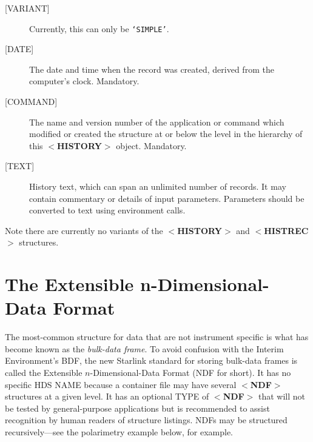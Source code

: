 \documentclass[twoside,11pt]{article}
\newcommand{\xlabel}[1]{}
\renewcommand{\_}{\texttt{\symbol{95}}}
\begin{document}
\begin{description}
\item [{[}VARIANT{]}]
Currently, this can only be {\tt `SIMPLE'}.
\item [{[}DATE{]}]
The date and time when the record was created, derived from the
computer's clock.  Mandatory.
\item [{[}COMMAND{]}]
The name and version number of the application or command
which modified or created the structure at
or below the level in the hierarchy of this
$<${\bf HISTORY}$>$ object.  Mandatory.
\item [{[}TEXT{]}]  History text, which can span an
unlimited number of records.  It may
contain commentary or details of input parameters.  Parameters should be
converted to text using environment calls.
\end{description}

Note there are currently no variants
of the $<${\bf HISTORY}$>$ and $<${\bf HIST\_REC}$>$
structures.

\xlabel{se_ndf}\section{The Extensible n-Dimensional-Data Format\label{se:ndf}}

The most-common structure for data that are not instrument specific is
what has become known as the {\it bulk-data frame}.  To avoid
confusion with the Interim Environment's BDF,
the new Starlink standard for storing bulk-data frames
is called the Extensible $n$-Dimensional-Data Format (NDF for short).
It has no specific HDS NAME because a container file may
have several $<${\bf NDF}$>$ structures at a given level.  It
has an optional
TYPE of $<${\bf NDF}$>$ that will not be tested by general-purpose
applications but is recommended to assist
recognition by human readers of structure listings.
NDFs may be structured recursively---see the
polarimetry example below, for example.
\end{document}
